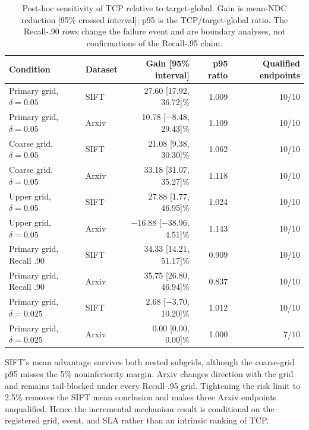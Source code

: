 \documentclass[sigconf,anonymous]{acmart}
\begin{document}
\begin{table}[t]
\caption{Post-hoc sensitivity of TCP relative to target-global. Gain is mean-NDC reduction [95\% crossed interval]; p95 is the TCP/target-global ratio. The Recall-.90 rows change the failure event and are boundary analyses, not confirmations of the Recall-.95 claim.}
\label{tab:equal-info-sensitivity}
\small\begin{tabular*}{\textwidth}{@{\extracolsep{\fill}}llrrr@{}}\toprule
Condition & Dataset & Gain [95\% interval] & p95 ratio & Qualified endpoints\\\midrule
Primary grid, $\delta=0.05$ & SIFT & 27.60 [17.92, 36.72]\% & 1.009 & 10/10\\
Primary grid, $\delta=0.05$ & Arxiv & 10.78 [$-8.48$, 29.43]\% & 1.109 & 10/10\\
Coarse grid, $\delta=0.05$ & SIFT & 21.08 [9.38, 30.30]\% & 1.062 & 10/10\\
Coarse grid, $\delta=0.05$ & Arxiv & 33.18 [31.07, 35.27]\% & 1.118 & 10/10\\
Upper grid, $\delta=0.05$ & SIFT & 27.88 [1.77, 46.95]\% & 1.024 & 10/10\\
Upper grid, $\delta=0.05$ & Arxiv & $-16.88$ [$-38.96$, 4.51]\% & 1.143 & 10/10\\
Primary grid, Recall .90 & SIFT & 34.33 [14.21, 51.17]\% & 0.909 & 10/10\\
Primary grid, Recall .90 & Arxiv & 35.75 [26.80, 46.94]\% & 0.837 & 10/10\\
Primary grid, $\delta=0.025$ & SIFT & 2.68 [$-3.70$, 10.20]\% & 1.012 & 10/10\\
Primary grid, $\delta=0.025$ & Arxiv & 0.00 [0.00, 0.00]\% & 1.000 & 7/10\\\bottomrule
\end{tabular*}
\end{table}

SIFT's mean advantage survives both nested subgrids, although the coarse-grid p95 misses the 5\% noninferiority margin. Arxiv changes direction with the grid and remains tail-blocked under every Recall-.95 grid. Tightening the risk limit to 2.5\% removes the SIFT mean conclusion and makes three Arxiv endpoints unqualified. Hence the incremental mechanism result is conditional on the registered grid, event, and SLA rather than an intrinsic ranking of TCP.
\end{document}
